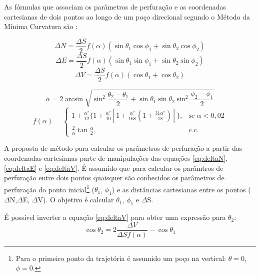 \documentclass[final,3p,12pt]{elsarticle}
\begin{document}
As fórmulas que associam os parâmetros de perfuração e as coordenadas cartesianas de dois pontos ao longo de um poço direcional segundo o Método da Mínima Curvatura são \cite{10.2118/84246-MS}:

\begin{equation} \label{eq:deltaN}
    \Delta N = \frac{\Delta S}{2} f(\alpha) (\sin \theta_1 \cos \phi_1 + \sin \theta_2 \cos \phi_2)
\end{equation}
\begin{equation} \label{eq:deltaE}
    \Delta E = \frac{\Delta S}{2} f(\alpha) (\sin \theta_1 \sin \phi_1 + \sin \theta_2 \sin \phi_2)
\end{equation}
\begin{equation} \label{eq:deltaV}
    \Delta V = \frac{\Delta S}{2} f(\alpha) (\cos \theta_1 + \cos \theta_2)
\end{equation}

\begin{equation} \label{eq:alpha}
    \alpha = 2 \arcsin \sqrt{ \sin^2 \frac{\theta_2-\theta_1}{2} + \sin \theta_1 \sin \theta_2 \sin^2 \frac{\phi_2-\phi_1}{2} }
\end{equation}
\begin{equation} \label{eq:f_alpha}
    f(\alpha)= \begin{cases}
        1+\frac{\alpha^2}{12}\{1+\frac{\alpha^2}{10}[1+\frac{\alpha^2}{168}(1+\frac{31\alpha^2}{18})]\},&\text{se } \alpha<0,02 \\
        \frac{2}{\alpha}\tan{\frac{\alpha}{2}},&\text{c.c. }  
    \end{cases}
\end{equation}

A proposta de método para calcular os parâmetros de perfuração a partir das coordenadas cartesianas parte de manipulações das equações \ref{eq:deltaN}, \ref{eq:deltaE} e \ref{eq:deltaV}. É assumido que para calcular os parâmtros de perfuração entre dois pontos quaisquer são conhecidos os parâmetros de perfuração do ponto inicial\footnote{Para o primeiro ponto da trajetória é assumido um poço na vertical: $\theta=0$, $\phi=0$.} ($\theta_1$, $\phi_1$) e as distâncias cartesianas entre os pontos ($\Delta$N,$\Delta$E, $\Delta$V). O objetivo é calcular $\theta_1$, $\phi_1$ e $\Delta$S.

É possível inverter a equação \ref{eq:deltaV} para obter uma expressão para $\theta_2$:
\begin{equation} \label{eq:cos_theta2}
    \cos \theta_2 = 2 \frac{\Delta V}{\Delta S f(\alpha)} - \cos \theta_1 
\end{equation}
\end{document}
